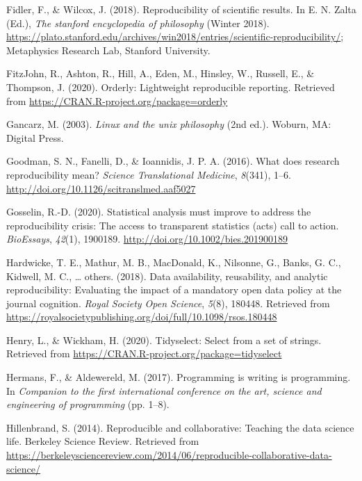 \documentclass[12pt,twoside]{reedthesis}
\begin{document}
\leavevmode\hypertarget{ref-sep-scientific-reproducibility}{}%
Fidler, F., \& Wilcox, J. (2018). Reproducibility of scientific results. In E. N. Zalta (Ed.), \emph{The stanford encyclopedia of philosophy} (Winter 2018). \url{https://plato.stanford.edu/archives/win2018/entries/scientific-reproducibility/}; Metaphysics Research Lab, Stanford University.

\leavevmode\hypertarget{ref-R-orderly}{}%
FitzJohn, R., Ashton, R., Hill, A., Eden, M., Hinsley, W., Russell, E., \& Thompson, J. (2020). Orderly: Lightweight reproducible reporting. Retrieved from \url{https://CRAN.R-project.org/package=orderly}

\leavevmode\hypertarget{ref-unix}{}%
Gancarz, M. (2003). \emph{Linux and the unix philosophy} (2nd ed.). Woburn, MA: Digital Press.

\leavevmode\hypertarget{ref-Goodman341ps12}{}%
Goodman, S. N., Fanelli, D., \& Ioannidis, J. P. A. (2016). What does research reproducibility mean? \emph{Science Translational Medicine}, \emph{8}(341), 1--6. \url{http://doi.org/10.1126/scitranslmed.aaf5027}

\leavevmode\hypertarget{ref-bioessays-gosselin}{}%
Gosselin, R.-D. (2020). Statistical analysis must improve to address the reproducibility crisis: The access to transparent statistics (acts) call to action. \emph{BioEssays}, \emph{42}(1), 1900189. \url{http://doi.org/10.1002/bies.201900189}

\leavevmode\hypertarget{ref-hardwicke2018data}{}%
Hardwicke, T. E., Mathur, M. B., MacDonald, K., Nilsonne, G., Banks, G. C., Kidwell, M. C., \ldots{} others. (2018). Data availability, reusability, and analytic reproducibility: Evaluating the impact of a mandatory open data policy at the journal cognition. \emph{Royal Society Open Science}, \emph{5}(8), 180448. Retrieved from \url{https://royalsocietypublishing.org/doi/full/10.1098/rsos.180448}

\leavevmode\hypertarget{ref-R-tidyselect}{}%
Henry, L., \& Wickham, H. (2020). Tidyselect: Select from a set of strings. Retrieved from \url{https://CRAN.R-project.org/package=tidyselect}

\leavevmode\hypertarget{ref-hermans2017programming}{}%
Hermans, F., \& Aldewereld, M. (2017). Programming is writing is programming. In \emph{Companion to the first international conference on the art, science and engineering of programming} (pp. 1--8).

\leavevmode\hypertarget{ref-berkeley_teaching}{}%
Hillenbrand, S. (2014). Reproducible and collaborative: Teaching the data science life. Berkeley Science Review. Retrieved from \url{https://berkeleysciencereview.com/2014/06/reproducible-collaborative-data-science/}
\end{document}
